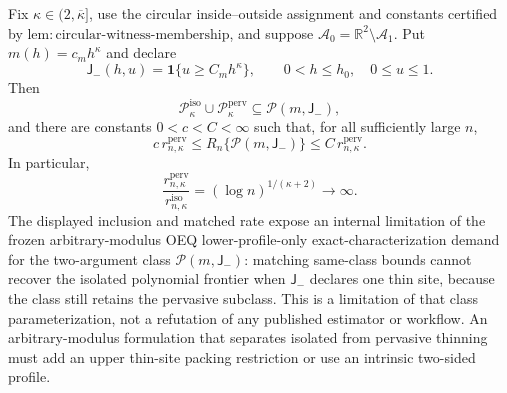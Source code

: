 Fix \(\kappa\in(2,\overline\kappa]\), use the circular inside--outside assignment and constants certified by \(\mathrm{lem:circular\text{-}witness\text{-}membership}\), and suppose \(\mathcal A_0=\mathbb R^2\setminus\mathcal A_1\).  Put \(m(h)=c_mh^\kappa\) and declare
\[
 \mathsf J_{-}(h,u)=\mathbf 1\{u\ge C_mh^\kappa\},
 \qquad 0<h\le h_0,\quad 0\le u\le1.
\]
Then
\[
 \mathcal P_{\kappa}^{\mathrm{iso}}\cup
 \mathcal P_{\kappa}^{\mathrm{perv}}
 \subseteq \mathcal P(m,\mathsf J_{-}),
\]
and there are constants \(0<c<C<\infty\) such that, for all sufficiently large \(n\),
\[
 c\,r_{n,\kappa}^{\mathrm{perv}}
 \le R_n\{\mathcal P(m,\mathsf J_{-})\}
 \le C\,r_{n,\kappa}^{\mathrm{perv}}.
\]
In particular,
\[
 \frac{r_{n,\kappa}^{\mathrm{perv}}}
 {r_{n,\kappa}^{\mathrm{iso}}}
 =(\log n)^{1/(\kappa+2)}\longrightarrow\infty.
\]
The displayed inclusion and matched rate expose an internal limitation of the frozen arbitrary-modulus OEQ lower-profile-only exact-characterization demand for the two-argument class \(\mathcal P(m,\mathsf J_{-})\): matching same-class bounds cannot recover the isolated polynomial frontier when \(\mathsf J_{-}\) declares one thin site, because the class still retains the pervasive subclass. This is a limitation of that class parameterization, not a refutation of any published estimator or workflow. An arbitrary-modulus formulation that separates isolated from pervasive thinning must add an upper thin-site packing restriction or use an intrinsic two-sided profile.